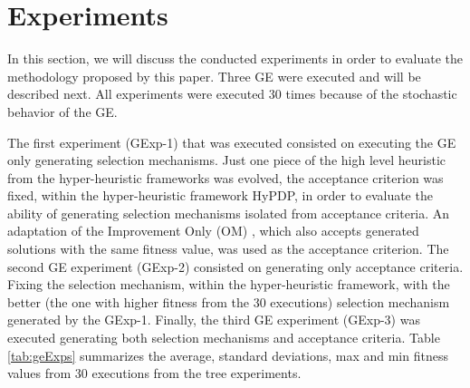 \documentclass[conference]{IEEEtran}
\begin{document}
%
%
%
%
%	
%	
%
%
%

\section{Experiments}

In this section, we will discuss the conducted experiments in order to evaluate the methodology proposed by this paper. Three GE were executed and will be described next. All experiments were executed 30 times because of the stochastic behavior of the GE. 

The first  experiment (GExp-1) that was executed consisted on executing the GE only generating selection mechanisms. Just one piece of the high level heuristic from the hyper-heuristic frameworks was evolved, the acceptance criterion was fixed, within the hyper-heuristic framework HyPDP,  in order to evaluate the ability of generating selection mechanisms isolated from acceptance criteria. An adaptation of the Improvement Only (OM) \cite{burke2013hyper}, which also accepts generated solutions with the same fitness value, was used as the acceptance criterion. The second GE experiment (GExp-2) consisted on generating only acceptance criteria. Fixing the selection mechanism, within the hyper-heuristic framework, with the better (the one with higher fitness from the 30 executions) selection mechanism generated by the GExp-1. Finally, the third GE experiment (GExp-3) was executed generating both selection mechanisms and acceptance criteria. Table \ref{tab:geExps} summarizes the average, standard deviations, max and min fitness values from 30 executions from the tree experiments.
\end{document}
